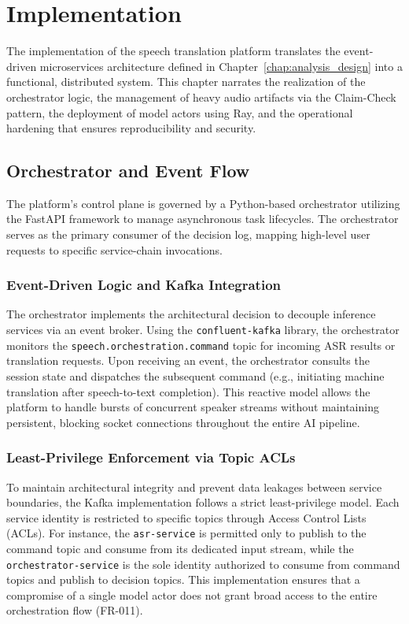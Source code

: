 \chapter{Implementation}
\label{chap:implementation}

The implementation of the speech translation platform translates the event-driven microservices architecture defined in Chapter~\ref{chap:analysis_design} into a functional, distributed system. This chapter narrates the realization of the orchestrator logic, the management of heavy audio artifacts via the Claim-Check pattern, the deployment of model actors using Ray, and the operational hardening that ensures reproducibility and security.

\section{Orchestrator and Event Flow}
\label{sec:impl_orchestrator}

The platform's control plane is governed by a Python-based orchestrator utilizing the FastAPI framework to manage asynchronous task lifecycles. The orchestrator serves as the primary consumer of the decision log, mapping high-level user requests to specific service-chain invocations.

\subsection{Event-Driven Logic and Kafka Integration}
The orchestrator implements the architectural decision to decouple inference services via an event broker. Using the \texttt{confluent-kafka} library, the orchestrator monitors the \texttt{speech.orchestration.command} topic for incoming ASR results or translation requests. Upon receiving an event, the orchestrator consults the session state and dispatches the subsequent command (e.g., initiating machine translation after speech-to-text completion). This reactive model allows the platform to handle bursts of concurrent speaker streams without maintaining persistent, blocking socket connections throughout the entire AI pipeline.

\subsection{Least-Privilege Enforcement via Topic ACLs}
To maintain architectural integrity and prevent data leakages between service boundaries, the Kafka implementation follows a strict least-privilege model. Each service identity is restricted to specific topics through Access Control Lists (ACLs). For instance, the \texttt{asr-service} is permitted only to publish to the command topic and consume from its dedicated input stream, while the \texttt{orchestrator-service} is the sole identity authorized to consume from command topics and publish to decision topics. This implementation ensures that a compromise of a single model actor does not grant broad access to the entire orchestration flow (FR-011).

